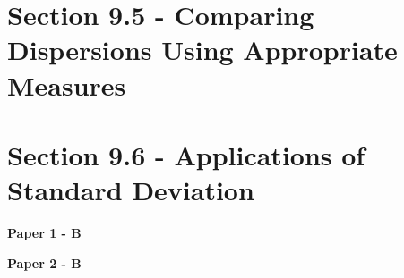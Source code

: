 \documentclass[12pt, a4paper]{article}
\begin{document}
\section*{Section 9.5 - Comparing Dispersions Using Appropriate Measures}\label{section:5-9-5}





\section*{Section 9.6 - Applications of Standard  Deviation \NF}\label{section:5-9-6}

\textbf{Paper 1 - B}
\begin{enumx}[label=\arabic*.,start=36]
\item {}\label{DSE2012P-CoreP1-Q15} 
\item {}\label{DSE2012-CoreP1-Q15} 
\item {}\label{DSE2015-CoreP1-Q15} 
\item {}\label{DSE2016-CoreP1-Q16} 
\end{enumx}
\textbf{Paper 2 - B}
\begin{enumx}[label=\arabic*.,start=40]
\item {}\label{DSE2014-CoreP2-Q44} 
\item {}\label{DSE2017-CoreP2-Q44} 
\item {}\label{DSE2018-CoreP2-Q44} 
\item {}\label{DSE2019-CoreP2-Q44} 
\item {}\label{DSE2020-CoreP2-Q44} 
\item {}\label{DSE2021-CoreP2-Q44} 
\item {}\label{DSE2022-CoreP2-Q44} 
\item {}\label{DSE2023-CoreP2-Q44} 
\item {}\label{DSE2024-CoreP2-Q44} 
\end{enumx}
\end{document}
